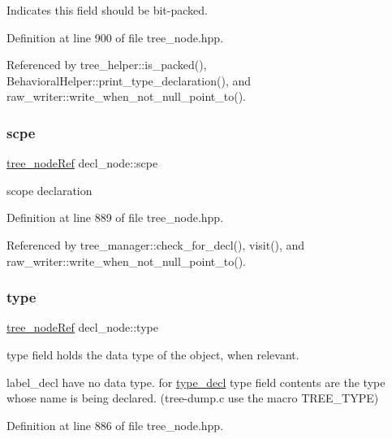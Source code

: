 Indicates this field should be bit-\/packed. 



Definition at line 900 of file tree\+\_\+node.\+hpp.



Referenced by tree\+\_\+helper\+::is\+\_\+packed(), Behavioral\+Helper\+::print\+\_\+type\+\_\+declaration(), and raw\+\_\+writer\+::write\+\_\+when\+\_\+not\+\_\+null\+\_\+point\+\_\+to().

\mbox{\label{structdecl__node_ac3e71763c580d5ee0b678e4a901a3766}} 
\subsubsection{\texorpdfstring{scpe}{scpe}}
{\footnotesize\ttfamily \hyperlink{tree__node_8hpp_a6ee377554d1c4871ad66a337eaa67fd5}{tree\+\_\+node\+Ref} decl\+\_\+node\+::scpe}



scope declaration 



Definition at line 889 of file tree\+\_\+node.\+hpp.



Referenced by tree\+\_\+manager\+::check\+\_\+for\+\_\+decl(), visit(), and raw\+\_\+writer\+::write\+\_\+when\+\_\+not\+\_\+null\+\_\+point\+\_\+to().

\mbox{\label{structdecl__node_a7f4982d034cf4e96b5c192060b6a3a1a}} 
\subsubsection{\texorpdfstring{type}{type}}
{\footnotesize\ttfamily \hyperlink{tree__node_8hpp_a6ee377554d1c4871ad66a337eaa67fd5}{tree\+\_\+node\+Ref} decl\+\_\+node\+::type}



type field holds the data type of the object, when relevant. 

label\+\_\+decl have no data type. for \hyperlink{structtype__decl}{type\+\_\+decl} type field contents are the type whose name is being declared. (tree-\/dump.\+c use the macro T\+R\+E\+E\+\_\+\+T\+Y\+PE) 

Definition at line 886 of file tree\+\_\+node.\+hpp.



